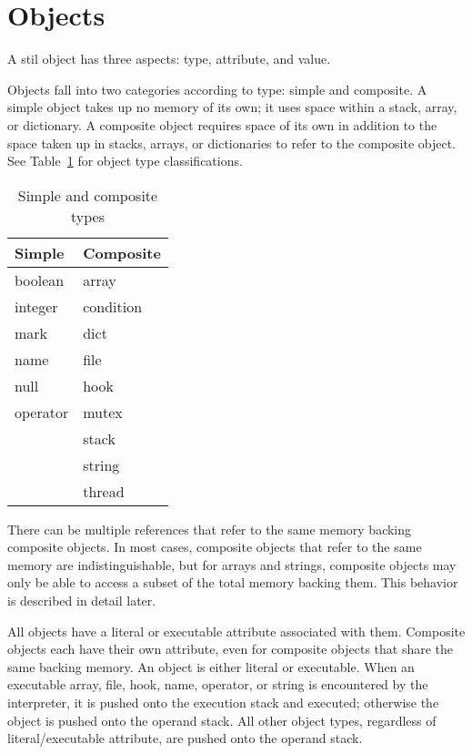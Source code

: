 \section{Objects}

A stil object has three aspects: type, attribute, and value.

Objects fall into two categories according to type: simple and composite.  A
simple object takes up no memory of its own; it uses space within a stack,
array, or dictionary.  A composite object requires space of its own in addition
to the space taken up in stacks, arrays, or dictionaries to refer to the
composite object.  See Table~\ref{simple-composite} for object type
classifications.

\begin{table}[htb]
\begin{center}
\begin{tabular}{|l|l|}
\hline
Simple	& Composite	\\
\hline \hline
boolean	& array		\\
integer	& condition	\\
mark	& dict		\\
name	& file		\\
null	& hook		\\
operator & mutex	\\
	& stack		\\
        & string	\\
	& thread	\\
\hline
\end{tabular}
\label{simple-composite}
\end{center}
\caption{Simple and composite types}
\end{table}

There can be multiple references that refer to the same memory backing composite
objects.  In most cases, composite objects that refer to the same memory are
indistinguishable, but for arrays and strings, composite objects may only be
able to access a subset of the total memory backing them.  This behavior is
described in detail later.

All objects have a literal or executable attribute associated with them.
Composite objects each have their own attribute, even for composite objects that
share the same backing memory.  An object is either literal or executable.  When
an executable array, file, hook, name, operator, or string is encountered by the
interpreter, it is pushed onto the execution stack and executed; otherwise the
object is pushed onto the operand stack.  All other object types, regardless of
literal/executable attribute, are pushed onto the operand stack.

